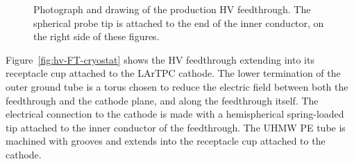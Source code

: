 \begin{figure}
\caption{Photograph and drawing of the production HV feedthrough. The spherical probe tip is attached to the end of the inner conductor, on the right side of these figures.}
\label{fig:hv_ftpic}
\end{figure}


Figure~\ref{fig:hv-FT-cryostat} shows the HV feedthrough extending into its receptacle cup attached to the LArTPC cathode.  The lower termination of the outer ground tube is a torus chosen to reduce the electric field between both the feedthrough and the cathode plane, and along the feedthrough itself.  The electrical connection to the cathode is made with a hemispherical spring-loaded tip attached to the inner conductor of the feedthrough.  The UHMW PE tube is machined with grooves and extends into the receptacle cup attached to the cathode.

